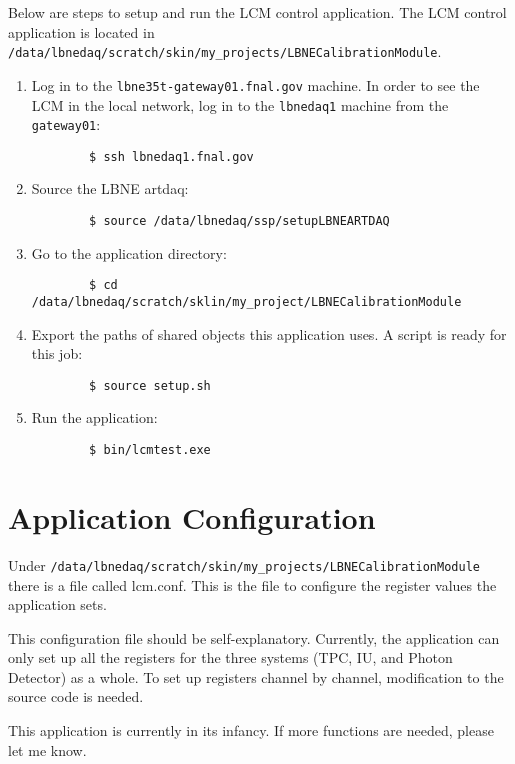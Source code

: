 \documentclass[12pt,a4paper,final]{iopart}
\begin{document}
Below are steps to setup and run the LCM control application. The LCM control application is located in \\
\verb|/data/lbnedaq/scratch/skin/my_projects/LBNECalibrationModule|.

\begin{enumerate}
	\item Log in to the \texttt{lbne35t-gateway01.fnal.gov} machine. In order to see the LCM in the local network, log in to the \texttt{lbnedaq1} machine from the \texttt{gateway01}:
	\begin{verbatim}
		$ ssh lbnedaq1.fnal.gov
	\end{verbatim}
	\item Source the LBNE artdaq:
	\begin{verbatim}
		$ source /data/lbnedaq/ssp/setupLBNEARTDAQ
	\end{verbatim}
	\item Go to the application directory:
	\begin{verbatim}
		$ cd /data/lbnedaq/scratch/sklin/my_project/LBNECalibrationModule
	\end{verbatim}
	\item Export the paths of shared objects this application uses. A script is ready for this job:
	\begin{verbatim}
		$ source setup.sh
	\end{verbatim}
	\item Run the application:
	\begin{verbatim}
		$ bin/lcmtest.exe
	\end{verbatim}
\end{enumerate}

\section{Application Configuration}
Under \verb|/data/lbnedaq/scratch/skin/my_projects/LBNECalibrationModule| there is a file called lcm.conf. This is the file to configure the register values the application sets.

This configuration file should be self-explanatory. Currently, the application can only set up all the registers for the three systems (TPC, IU, and Photon Detector) as a whole. To set up registers channel by channel, modification to the source code is needed.

This application is currently in its infancy. If more functions are needed, please let me know.

%
%
\end{document}
